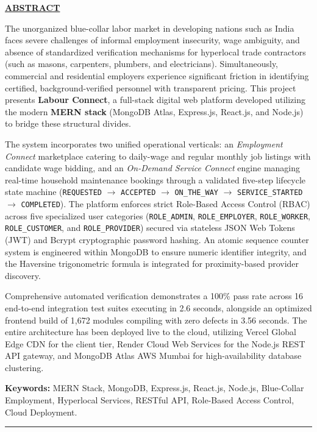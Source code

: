 \newpage
{}
\begin{center}
\vspace*{-12mm}
{\LARGE\textbf{\underline{ABSTRACT}}}\\[6mm]
\end{center}

The unorganized blue-collar labor market in developing nations such as India faces severe challenges of informal employment insecurity, wage ambiguity, and absence of standardized verification mechanisms for hyperlocal trade contractors (such as masons, carpenters, plumbers, and electricians). Simultaneously, commercial and residential employers experience significant friction in identifying certified, background-verified personnel with transparent pricing. This project presents \textbf{Labour Connect}, a full-stack digital web platform developed utilizing the modern \textbf{MERN stack} (MongoDB Atlas, Express.js, React.js, and Node.js) to bridge these structural divides.

The system incorporates two unified operational verticals: an \textit{Employment Connect} marketplace catering to daily-wage and regular monthly job listings with candidate wage bidding, and an \textit{On-Demand Service Connect} engine managing real-time household maintenance bookings through a validated five-step lifecycle state machine (\texttt{REQUESTED} $\rightarrow$ \texttt{ACCEPTED} $\rightarrow$ \texttt{ON\_THE\_WAY} $\rightarrow$ \texttt{SERVICE\_STARTED} $\rightarrow$ \texttt{COMPLETED}). The platform enforces strict Role-Based Access Control (RBAC) across five specialized user categories (\texttt{ROLE\_ADMIN}, \texttt{ROLE\_EMPLOYER}, \texttt{ROLE\_WORKER}, \texttt{ROLE\_CUSTOMER}, and \texttt{ROLE\_PROVIDER}) secured via stateless JSON Web Tokens (JWT) and Bcrypt cryptographic password hashing. An atomic sequence counter system is engineered within MongoDB to ensure numeric identifier integrity, and the Haversine trigonometric formula is integrated for proximity-based provider discovery.

Comprehensive automated verification demonstrates a 100\% pass rate across 16 end-to-end integration test suites executing in 2.6 seconds, alongside an optimized frontend build of 1,672 modules compiling with zero defects in 3.56 seconds. The entire architecture has been deployed live to the cloud, utilizing Vercel Global Edge CDN for the client tier, Render Cloud Web Services for the Node.js REST API gateway, and MongoDB Atlas AWS Mumbai for high-availability database clustering.

\vspace{5mm}
\noindent\textbf{Keywords:} MERN Stack, MongoDB, Express.js, React.js, Node.js, Blue-Collar Employment, Hyperlocal Services, RESTful API, Role-Based Access Control, Cloud Deployment.

\vspace{8mm}
\rule{\textwidth}{0.01in}
\clearpage
